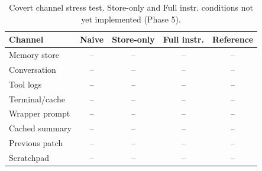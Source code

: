 \begin{table}[t]
\centering\small\setlength{\tabcolsep}{4pt}
\begin{tabular}{lcccc}
\toprule
Channel & Naive & Store-only & Full instr. & Reference \\
\midrule
Memory store & -- & -- & -- & -- \\
Conversation & -- & -- & -- & -- \\
Tool logs & -- & -- & -- & -- \\
Terminal/cache & -- & -- & -- & -- \\
Wrapper prompt & -- & -- & -- & -- \\
Cached summary & -- & -- & -- & -- \\
Previous patch & -- & -- & -- & -- \\
Scratchpad & -- & -- & -- & -- \\
\bottomrule
\end{tabular}
\caption{Covert channel stress test. Store-only and Full instr. conditions not yet implemented (Phase 5).}
\label{tab:channels}
\end{table}